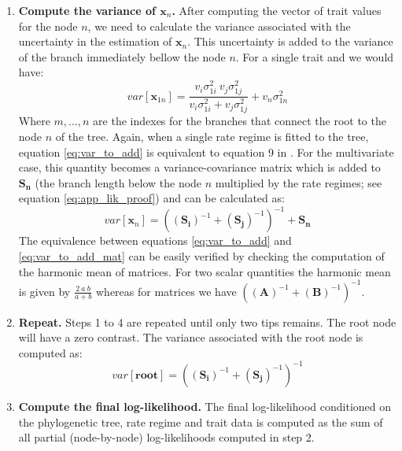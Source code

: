 \begin{enumerate}
\item \textbf{Compute the variance of $\mathbf{x}_{n}$.} After computing the vector of trait values for the node $n$, we need to calculate the variance associated with the uncertainty in the estimation of $\mathbf{x}_{n}$. This uncertainty is added to the variance of the branch immediately bellow the node $n$. For a single trait and we would have:
\begin{equation} \label{eq:var_to_add}
var[\mathbf{x}_{1n}] = \frac{v_{i} \sigma^{2}_{1i} \: v_{j} \sigma^{2}_{1j}}{v_{i} \sigma^{2}_{1i} + v_{j} \sigma^{2}_{1j}} + v_{n} \sigma^{2}_{1n}
\end{equation}
Where $m, \ldots, n$ are the indexes for the branches that connect the root to the node $n$ of the tree. Again, when a single rate regime is fitted to the tree, equation \ref{eq:var_to_add} is equivalent to equation 9 in \citet{felsenstein_1973}.  For the multivariate case, this quantity becomes a variance-covariance matrix which is added to $\mathbf{S_{n}}$ (the branch length below the node $n$ multiplied by the rate regimes; see equation \ref{eq:app_lik_proof}) and can be calculated as:
\begin{equation}\label{eq:var_to_add_mat}
var[\mathbf{x}_{n}] = \left( (\mathbf{S_{i}})^{-1} + (\mathbf{S_{j}})^{-1} \right)^{-1} + \mathbf{S_{n}}
\end{equation}
The equivalence between equations \ref{eq:var_to_add} and \ref{eq:var_to_add_mat} can be easily verified by checking the computation of the harmonic mean of matrices. For two scalar quantities the harmonic mean is given by $\frac{2 \: a \: b}{a+b } $ whereas for matrices we have $ \left( (\mathbf{A})^{-1} + (\mathbf{B})^{-1} \right)^{-1} $.

\item \textbf{Repeat.} Steps 1 to 4 are repeated until only two tips remains. The root node will have a zero contrast. The variance associated with the root node is computed as:
\begin{equation}
var[\mathbf{root}] = \left( (\mathbf{S_{i}})^{-1} + (\mathbf{S_{j}})^{-1} \right)^{-1}
\end{equation}

\item \textbf{Compute the final log-likelihood.} The final log-likelihood conditioned on the phylogenetic tree, rate regime and trait data is computed as the sum of all partial (node-by-node) log-likelihoods computed in step 2.

\end{enumerate}

